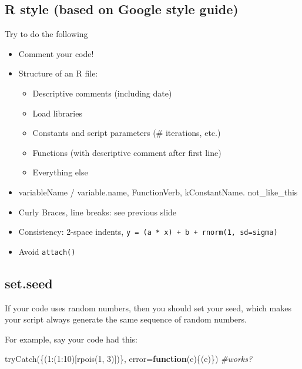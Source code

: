 \documentclass[
  letterpaper,
  DIV=11,
  numbers=noendperiod]{scrreprt}
\newenvironment{Shaded}{\begin{snugshade}}{\end{snugshade}}
\newcommand{\AttributeTok}[1]{\textcolor[rgb]{0.49,0.56,0.16}{#1}}
\newcommand{\CommentTok}[1]{\textcolor[rgb]{0.38,0.63,0.69}{\textit{#1}}}
\newcommand{\ControlFlowTok}[1]{\textcolor[rgb]{0.00,0.44,0.13}{\textbf{#1}}}
\newcommand{\DecValTok}[1]{\textcolor[rgb]{0.25,0.63,0.44}{#1}}
\newcommand{\FunctionTok}[1]{\textcolor[rgb]{0.02,0.16,0.49}{#1}}
\newcommand{\NormalTok}[1]{\textcolor[rgb]{0.00,0.44,0.13}{#1}}
\newcommand{\SpecialCharTok}[1]{\textcolor[rgb]{0.25,0.44,0.63}{#1}}
\providecommand{\tightlist}{%
  \setlength{\itemsep}{0pt}\setlength{\parskip}{0pt}}\usepackage{longtable,booktabs,array}
\begin{document}
\hypertarget{r-style-based-on-google-style-guide}{%
\subsection{R style (based on Google style
guide)}\label{r-style-based-on-google-style-guide}}

Try to do the following

\begin{itemize}
\tightlist
\item
  Comment your code!
\item
  Structure of an R file:

  \begin{itemize}
  \tightlist
  \item
    Descriptive comments (including date)
  \item
    Load libraries
  \item
    Constants and script parameters (\# iterations, etc.)
  \item
    Functions (with descriptive comment after first line)
  \item
    Everything else
  \end{itemize}
\item
  variableName / variable.name, FunctionVerb, kConstantName.
  not\_like\_this
\item
  Curly Braces, line breaks: see previous slide
\item
  Consistency: 2-space indents,
  \texttt{y\ =\ (a\ *\ x)\ +\ b\ +\ rnorm(1,\ sd=sigma)}
\item
  Avoid \texttt{attach()}
\end{itemize}

\hypertarget{set.seed}{%
\subsection{set.seed}\label{set.seed}}

If your code uses random numbers, then you should set your seed, which
makes your script always generate the same sequence of random numbers.

For example, say your code had this:

\begin{Shaded}
\begin{Highlighting}[]
\FunctionTok{tryCatch}\NormalTok{(\{(}\DecValTok{1}\SpecialCharTok{:}\NormalTok{(}\DecValTok{1}\SpecialCharTok{:}\DecValTok{10}\NormalTok{)[}\FunctionTok{rpois}\NormalTok{(}\DecValTok{1}\NormalTok{, }\DecValTok{3}\NormalTok{)])\}, }\AttributeTok{error=}\ControlFlowTok{function}\NormalTok{(e)\{(e)\}) }\CommentTok{\#works?}
\end{Highlighting}
\end{Shaded}
\end{document}
